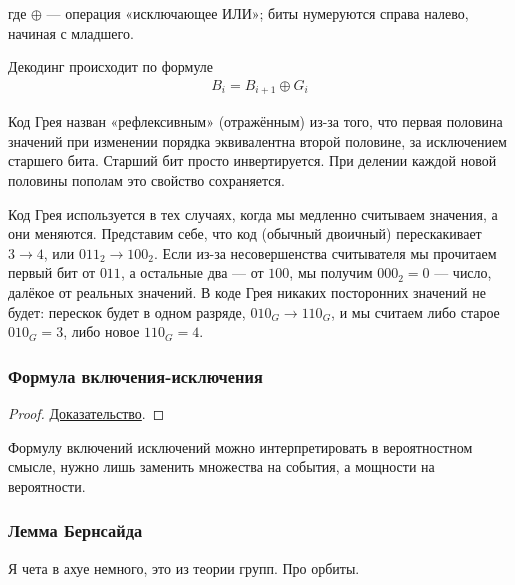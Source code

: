 где $\oplus$ — операция «исключающее ИЛИ»; биты нумеруются справа налево, начиная с младшего. 

Декодинг происходит по формуле 
\begin{align*}
	B_i = B_{i + 1} \oplus G_i
\end{align*}

Код Грея назван «рефлексивным» (отражённым) из-за того, что первая половина значений при изменении порядка эквивалентна второй половине, за исключением старшего бита. Старший бит просто инвертируется. При делении каждой новой половины пополам это свойство сохраняется.

Код Грея используется в тех случаях, когда мы медленно считываем значения, а они меняются. Представим себе, что код (обычный двоичный) перескакивает $3\rightarrow4$, или $011_2 \rightarrow 100_2$. Если из-за несовершенства считывателя мы прочитаем первый бит от $011$, а остальные два — от $100$, мы получим $000_2=0$ — число, далёкое от реальных значений. В коде Грея никаких посторонних значений не будет: перескок будет в одном разряде, $010_G \rightarrow 110_G$, и мы считаем либо старое $010_G=3$, либо новое $110_G=4$. 

\subsubsection{Формула включения-исключения}

\begin{proof}
	\href{https://neerc.ifmo.ru/wiki/index.php?title=%D0%A4%D0%BE%D1%80%D0%BC%D1%83%D0%BB%D0%B0_%D0%B2%D0%BA%D0%BB%D1%8E%D1%87%D0%B5%D0%BD%D0%B8%D1%8F-%D0%B8%D1%81%D0%BA%D0%BB%D1%8E%D1%87%D0%B5%D0%BD%D0%B8%D1%8F}{Доказательство}.
\end{proof}

Формулу включений исключений можно интерпретировать в вероятностном смысле, нужно лишь заменить множества на события, а мощности на вероятности. 

\subsubsection{Лемма Бернсайда}
Я чета в ахуе немного, это из теории групп. Про орбиты. 

